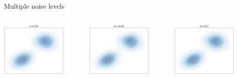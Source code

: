 \documentclass[handout, aspectratio=169,xcolor=dvipsnames]{beamer}
\begin{document}
\begin{frame}{Multiple noise levels}

  \begin{columns}
    \begin{column}{0.32\textwidth}
      \includegraphics[width=0.8\textwidth]{figs/gen/mixture_with_noise_0.0.png}
    \end{column}
      \begin{column}{0.32\textwidth}
      \includegraphics[width=0.8\textwidth]{figs/gen/mixture_with_noise_0.01.png}
    \end{column}
    \begin{column}{0.32\textwidth}
      \includegraphics[width=0.8\textwidth]{figs/gen/mixture_with_noise_0.1.png}

\end{column}
\end{columns}
\end{frame}
\end{document}
